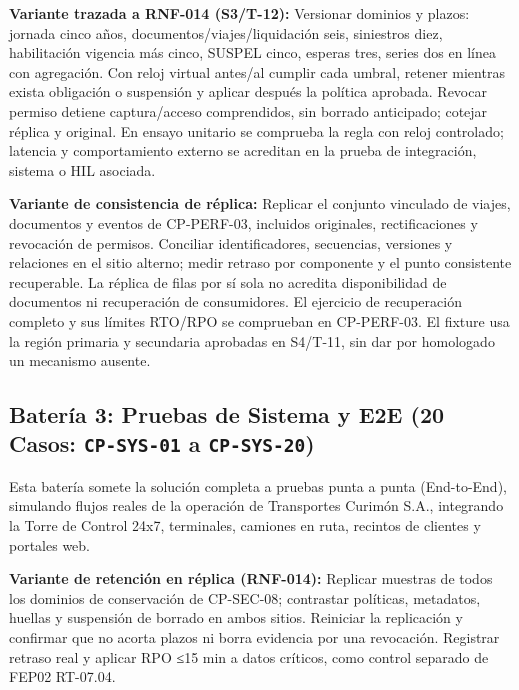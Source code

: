 \par\noindent \textbf{Variante trazada a RNF-014 (S3/T-12):} Versionar dominios y plazos: jornada cinco años, documentos/viajes/liquidación seis, siniestros diez, habilitación vigencia más cinco, SUSPEL cinco, esperas tres, series dos en línea con agregación. Con reloj virtual antes/al cumplir cada umbral, retener mientras exista obligación o suspensión y aplicar después la política aprobada. Revocar permiso detiene captura/acceso comprendidos, sin borrado anticipado; cotejar réplica y original. En ensayo unitario se comprueba la regla con reloj controlado; latencia y comportamiento externo se acreditan en la prueba de integración, sistema o HIL asociada.\par


\par\noindent\textbf{Variante de consistencia de réplica:} Replicar el conjunto vinculado de viajes, documentos y eventos de CP-PERF-03, incluidos originales, rectificaciones y revocación de permisos. Conciliar identificadores, secuencias, versiones y relaciones en el sitio alterno; medir retraso por componente y el punto consistente recuperable. La réplica de filas por sí sola no acredita disponibilidad de documentos ni recuperación de consumidores. El ejercicio de recuperación completo y sus límites RTO/RPO se comprueban en CP-PERF-03. El fixture usa la región primaria y secundaria aprobadas en S4/T-11, sin dar por homologado un mecanismo ausente.\par

\subsection*{Batería 3: Pruebas de Sistema y E2E (20 Casos: \texttt{C\allowbreak{}P\allowbreak{}-\allowbreak{}S\allowbreak{}Y\allowbreak{}S\allowbreak{}-\allowbreak{}0\allowbreak{}1\allowbreak{}} a \texttt{C\allowbreak{}P\allowbreak{}-\allowbreak{}S\allowbreak{}Y\allowbreak{}S\allowbreak{}-\allowbreak{}2\allowbreak{}0\allowbreak{}})}

Esta batería somete la solución completa a pruebas punta a punta (End-to-End), simulando flujos reales de la operación de Transportes Curimón S.A., integrando la Torre de Control 24x7, terminales, camiones en ruta, recintos de clientes y portales web.




\par\noindent\textbf{Variante de retención en réplica (RNF-014):} Replicar muestras de todos los dominios de conservación de CP-SEC-08; contrastar políticas, metadatos, huellas y suspensión de borrado en ambos sitios. Reiniciar la replicación y confirmar que no acorta plazos ni borra evidencia por una revocación. Registrar retraso real y aplicar RPO ≤15 min a datos críticos, como control separado de FEP02 RT-07.04.\par\par







